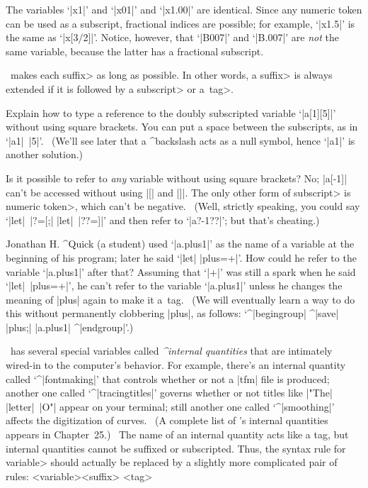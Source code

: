 {\danger The variables `|x1|' and `|x01|' and `|x1.00|' are identical.
Since any numeric token can be used as a subscript, fractional indices
are possible; for example, `|x1.5|' is the same as `|x[3/2]|'. Notice,
however, that `|B007|' and `|B.007|' are {\sl not\/} the same variable,
because the latter has a fractional subscript.

\danger \MF\ makes each \<suffix> as long as possible. In other words,
a \<suffix> is always extended if it is followed by a \<subscript>
or a~\<tag>.

\dangerexercise Explain how to type a reference to the doubly subscripted
variable `|a[1][5]|' without using square brackets.
\answer You can put a space between the subscripts, as in `|a1|~|5|'. \
(We'll see later that a ^{backslash} acts as a null symbol,
hence `|a1\5|' is another solution.)

\dangerexercise Is it possible to refer to {\sl any\/} variable without
using square brackets?
\answer No; |a[-1]| can't be accessed without using |[| and |]|. The
only other form of \<subscript> is \<numeric token>, which can't be
negative. \ (Well, strictly speaking, you could say `|let|~|?=[;|
|let|~|??=]|' and then refer to `|a?-1??|'; but that's cheating.)

\ddangerexercise Jonathan H. ^{Quick} (a student) used `|a.plus1|' as the name
of a variable at the beginning of his program; later he said `|let|
|plus=+|'. How could he refer to the variable `|a.plus1|' after that?
\answer Assuming that `|+|' was still a spark when he said `|let|~|plus=+|',
he can't refer to the variable `|a.plus1|' unless he changes the meaning of
|plus| again to make it a~tag. \ (We will eventually learn a way to do this
without permanently clobbering |plus|, as follows: `^|begingroup| ^|save|
|plus;| |a.plus1| ^|endgroup|'.)

\danger \MF\ has several special variables called {\sl^{internal
quantities}\/} that are intimately wired-in to the computer's behavior.
For example, there's an internal quantity called `^|fontmaking|' that controls
whether or not a |tfm| file is produced; another one called `^|tracingtitles|'
governs whether or not titles like |"The| |letter|~|O"| appear on your
terminal; still another one called `^|smoothing|' affects the digitization of
curves. \ (A complete list of \MF's internal quantities appears in
Chapter~25.) \ The name of an internal quantity acts like a tag, but
internal quantities cannot be suffixed or subscripted.
Thus, the syntax rule for \<variable>
should actually be replaced by a slightly more complicated pair of rules:
\beginsyntax
<variable>\is<external tag><suffix>\alt<internal quantity>
<tag>\is<external tag>\alt<internal quantity>
\endsyntax

}
